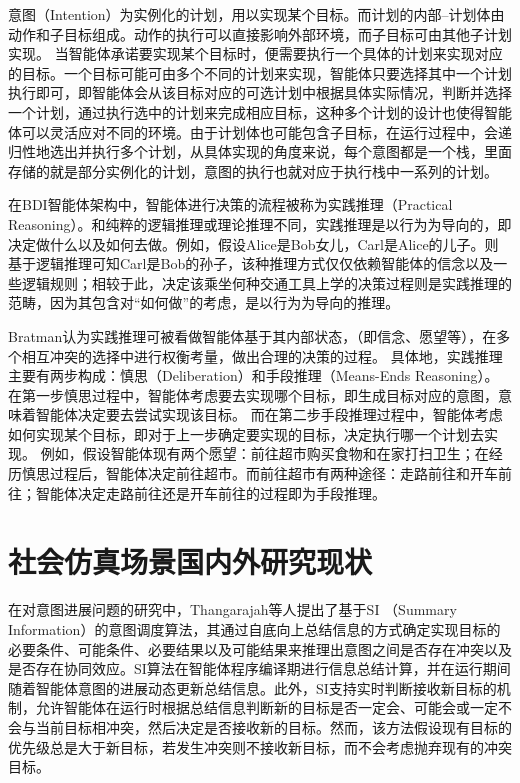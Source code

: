 意图（Intention）为实例化的计划，用以实现某个目标。而计划的内部--计划体由动作和子目标组成。动作的执行可以直接影响外部环境，而子目标可由其他子计划实现。 当智能体承诺要实现某个目标时，便需要执行一个具体的计划来实现对应的目标。一个目标可能可由多个不同的计划来实现，智能体只要选择其中一个计划执行即可，即智能体会从该目标对应的可选计划中根据具体实际情况，判断并选择一个计划，通过执行选中的计划来完成相应目标，这种多个计划的设计也使得智能体可以灵活应对不同的环境。由于计划体也可能包含子目标，在运行过程中，会递归性地选出并执行多个计划，从具体实现的角度来说，每个意图都是一个栈，里面存储的就是部分实例化的计划，意图的执行也就对应于执行栈中一系列的计划。

在BDI智能体架构中，智能体进行决策的流程被称为实践推理（Practical Reasoning）。和纯粹的逻辑推理或理论推理不同，实践推理是以行为为导向的，即决定做什么以及如何去做。例如，假设Alice是Bob女儿，Carl是Alice的儿子。则基于逻辑推理可知Carl是Bob的孙子，该种推理方式仅仅依赖智能体的信念以及一些逻辑规则；相较于此，决定该乘坐何种交通工具上学的决策过程则是实践推理的范畴，因为其包含对“如何做”的考虑，是以行为为导向的推理。

Bratman\cite{bratman1987intention}认为实践推理可被看做智能体基于其内部状态，（即信念、愿望等），在多个相互冲突的选择中进行权衡考量，做出合理的决策的过程。
%
具体地，实践推理主要有两步构成：慎思（Deliberation）和手段推理（Means-Ends Reasoning）。
%
在第一步慎思过程中，智能体考虑要去实现哪个目标，即生成目标对应的意图，意味着智能体决定要去尝试实现该目标。
%
而在第二步手段推理过程中，智能体考虑如何实现某个目标，即对于上一步确定要实现的目标，决定执行哪一个计划去实现。
例如，假设智能体现有两个愿望：前往超市购买食物和在家打扫卫生；在经历慎思过程后，智能体决定前往超市。而前往超市有两种途径：走路前往和开车前往；智能体决定走路前往还是开车前往的过程即为手段推理。

\section{社会仿真场景国内外研究现状}
在对意图进展问题的研究中，Thangarajah等人\cite{DBLP:journals/jar/ThangarajahP11,DBLP:conf/ijcai/ThangarajahPW03}提出了基于SI （Summary Information）的意图调度算法，其通过自底向上总结信息的方式确定实现目标的必要条件、可能条件、必要结果以及可能结果来推理出意图之间是否存在冲突以及是否存在协同效应。SI算法在智能体程序编译期进行信息总结计算，并在运行期间随着智能体意图的进展动态更新总结信息。此外，SI支持实时判断接收新目标的机制，允许智能体在运行时根据总结信息判断新的目标是否一定会、可能会或一定不会与当前目标相冲突，然后决定是否接收新的目标。然而，该方法假设现有目标的优先级总是大于新目标，若发生冲突则不接收新目标，而不会考虑抛弃现有的冲突目标。


